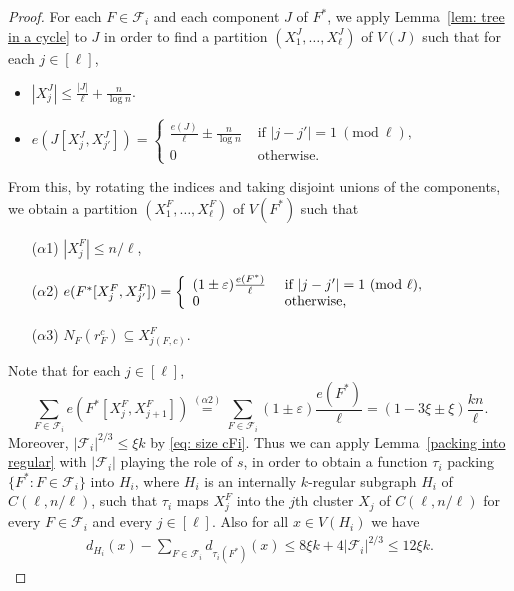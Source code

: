 \documentclass[a4paper, 11pt, reqno]{amsart}
\numberwithin{equation}{section}
\newcommand{\1}{{\rm 1\hspace*{-0.4ex}%
\rule{0.1ex}{1.52ex}\hspace*{0.2ex}}}
\newcommand{\cF}{\mathcal{F}}
\renewcommand{\epsilon}{\varepsilon}
\newcommand{\COMMENT}[1]{}
\begin{document}
\begin{proof}
For each $F\in \cF_i$ and each component $J$ of $F^*$, we apply Lemma~\ref{lem: tree in a cycle} to $J$ in order to find a partition $(X^J_1,\dots, X^J_\ell)$ of $V(J)$ such that for each $j\in [\ell]$, 
\begin{itemize}
\item $|X^J_{j}| \leq \frac{|J|}{\ell} + \frac{n}{\log{n}}$.
\item $e(J[X^J_{j},X^J_{j'}]) = \left\{\begin{array}{ll}
\frac{e(J)}{\ell} \pm \frac{n}{\log{n}} & \text{ if } |j-j'|=1~(\text{mod}~\ell),\\
0 & \text{ otherwise.}
\end{array}\right.$
\end{itemize}
From this, by rotating the indices and taking disjoint unions of the components, we obtain a partition $(X^F_1,\dots, X^F_{\ell})$ of $V(F^*)$ such that 
\begin{itemize}
\item[($\alpha$1)] $|X^F_{j}|\leq n/\ell$, \COMMENT{Note that $|F|\leq (1-\eta)n$, thus for each $j\in[\ell]$ $\sum_{J} |X^J_j| \leq (1-\eta)n/\ell + 2\Delta n/\log(n) \leq n/\ell$.} 
\item[($\alpha$2)] $ e(F^*[X^F_{j},X^F_{j'}]) = \left\{\begin{array}{ll}
(1\pm \epsilon) \frac{e(F^*)}{\ell} & \text{ if $|j-j'|=1$ } ({\rm mod} ~\ell),  \\
0 & \text{ otherwise,}\\ 
\end{array}\right.
$
\item[($\alpha$3)] $N_{F}(r^c_F)\subseteq X^F_{j(F,c)}$.
\end{itemize}
Note that for each $j\in [\ell]$,
$$\sum_{F\in \cF_i} e(F^*[X_j^F, X_{j+1}^F])\stackrel{(\alpha2)}{=} \sum_{F\in \cF_i}(1\pm \epsilon) \frac{e(F^*)}{\ell} = (1-3\xi\pm \xi)\frac{kn}{\ell}.$$
Moreover, $|\cF_i|^{2/3}\leq \xi k$ by \eqref{eq: size cFi}. Thus we can apply Lemma~\ref{packing into regular} with $|\cF_i|$ playing the role of $s$, in order to obtain a function $\tau_i$ packing $\{F^*: F\in \cF_i\}$ into $H_i$, where $H_i$ is an internally $k$-regular subgraph $H_i$ of $C(\ell,n/\ell)$, such that $\tau_i$ maps $X_j^F$ into the $j$th cluster $X_j$ of $C(\ell,n/\ell)$ for every $F\in \cF_i$ and every $j\in [\ell]$. Also for all $x\in V(H_i)$ we have 
\begin{align}\label{real edges in Hi}
d_{H_i}(x) - \sum_{F\in \cF_i} d_{\tau_i(F^*)}(x) \leq 8\xi k + 4 |\cF_i|^{2/3} \leq 12\xi k.
\end{align} 

\end{proof}
\end{document}
